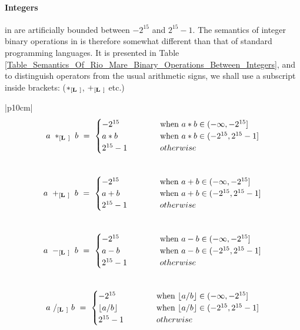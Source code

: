 \documentclass{article}
\begin{document}
\paragraph{Integers} in \plname are artificially bounded between $-2^{15}$ and $2^{15}-1$.
The semantics of integer binary operations in \plname is therefore somewhat different
than that of standard programming languages.
It is presented in Table \ref{Table_Semantics_Of_Rio_Mare_Binary_Operations_Between_Integers},
and to distinguish \plname operators from the usual arithmetic signs,
we shall use a \plname subscript inside brackets:
($*_{[\textbf{L}\ ]}$, $+_{[\textbf{L}\ ]}$ etc.)
\begin{table}[h]
\centering
\begin{tabular}{|p{10cm}|}
\hline
\[
a ~ *_{[\textbf{L}\ ]} ~ b ~ = ~
\begin{cases} 
-2^{15}  ~ & ~ ~ ~ ~ ~ ~ ~ ~ \text{when} ~ a*b \in (-\infty, -2^{15}] \\
a*b      ~ & ~ ~ ~ ~ ~ ~ ~ ~ \text{when} ~ a*b \in (-2^{15},2^{15}-1] \\
2^{15}-1 ~ & ~ ~ ~ ~ ~ ~ ~ ~ otherwise                                \\
\end{cases}
\]
\\ \hline
\[
a ~ +_{[\textbf{L}\ ]} ~ b ~ = ~
\begin{cases} 
-2^{15}  ~ & ~ ~ ~ ~ ~ ~ ~ ~ \text{when} ~ a+b \in (-\infty, -2^{15}] \\
a+b      ~ & ~ ~ ~ ~ ~ ~ ~ ~ \text{when} ~ a+b \in (-2^{15},2^{15}-1] \\
2^{15}-1 ~ & ~ ~ ~ ~ ~ ~ ~ ~ otherwise                                \\
\end{cases}
\]
\\ \hline
\[
a ~ -_{[\textbf{L}\ ]} ~ b ~ = ~
\begin{cases} 
-2^{15}  ~ & ~ ~ ~ ~ ~ ~ ~ ~ \text{when} ~ a-b \in (-\infty, -2^{15}] \\
a-b      ~ & ~ ~ ~ ~ ~ ~ ~ ~ \text{when} ~ a-b \in (-2^{15},2^{15}-1] \\
2^{15}-1 ~ & ~ ~ ~ ~ ~ ~ ~ ~ otherwise                                \\
\end{cases}
\]
\\ \hline
\[
a ~ /_{[\textbf{L}\ ]} ~ b ~ = ~
\begin{cases} 
-2^{15}             ~ & ~ ~ ~ ~ ~ ~ ~ ~ \text{when} ~ \lfloor a/b \rfloor \in (-\infty, -2^{15}] \\
\lfloor a/b \rfloor ~ & ~ ~ ~ ~ ~ ~ ~ ~ \text{when} ~ \lfloor a/b \rfloor \in (-2^{15},2^{15}-1] \\
2^{15}-1            ~ & ~ ~ ~ ~ ~ ~ ~ ~ otherwise                                                \\
\end{cases}
\]
\\ \hline
\end{tabular}
\caption{Semantics of \plname binary operations between integers
\label{Table_Semantics_Of_Rio_Mare_Binary_Operations_Between_Integers}}
\end{table}
\end{document}

